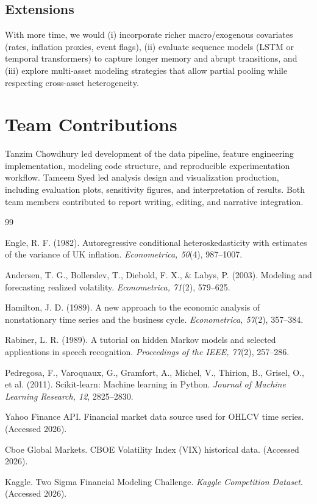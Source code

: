 \documentclass[11pt]{article}
\begin{document}
\subsection{Extensions}
With more time, we would (i) incorporate richer macro/exogenous covariates (rates, inflation proxies, event flags), (ii) evaluate sequence models (LSTM or temporal transformers) to capture longer memory and abrupt transitions, and (iii) explore multi-asset modeling strategies that allow partial pooling while respecting cross-asset heterogeneity.

\section{Team Contributions}
Tanzim Chowdhury led development of the data pipeline, feature engineering implementation, modeling code structure, and reproducible experimentation workflow. Tameem Syed led analysis design and visualization production, including evaluation plots, sensitivity figures, and interpretation of results. Both team members contributed to report writing, editing, and narrative integration.

\newpage

\begin{thebibliography}{99}
\setlength{\itemsep}{2pt}

Engle, R. F. (1982).
Autoregressive conditional heteroskedasticity with estimates of the variance of UK inflation.
\textit{Econometrica, 50}(4), 987--1007.

Andersen, T. G., Bollerslev, T., Diebold, F. X., \& Labys, P. (2003).
Modeling and forecasting realized volatility.
\textit{Econometrica, 71}(2), 579--625.

Hamilton, J. D. (1989).
A new approach to the economic analysis of nonstationary time series and the business cycle.
\textit{Econometrica, 57}(2), 357--384.

Rabiner, L. R. (1989).
A tutorial on hidden Markov models and selected applications in speech recognition.
\textit{Proceedings of the IEEE, 77}(2), 257--286.

Pedregosa, F., Varoquaux, G., Gramfort, A., Michel, V., Thirion, B., Grisel, O., et al. (2011).
Scikit-learn: Machine learning in Python.
\textit{Journal of Machine Learning Research, 12}, 2825--2830.

Yahoo Finance API.
Financial market data source used for OHLCV time series.
(Accessed 2026).

Cboe Global Markets.
CBOE Volatility Index (VIX) historical data.
(Accessed 2026).

Kaggle.
Two Sigma Financial Modeling Challenge.
\textit{Kaggle Competition Dataset}.
(Accessed 2026).

\end{thebibliography}
\end{document}
